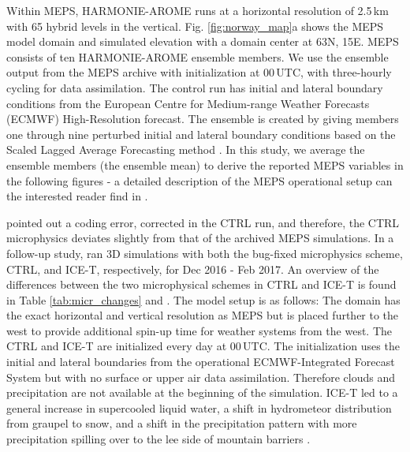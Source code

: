 \documentclass{ametsocV5}
\begin{document}
		Within MEPS, HARMONIE-AROME runs at a horizontal resolution of 2.5\,km with 65 hybrid levels in the vertical. Fig. \ref{fig:norway_map}a shows the MEPS model domain and simulated elevation with a domain center at 63\textdegree N, 15\textdegree E. MEPS consists of ten HARMONIE-AROME ensemble members. We use the ensemble output from the MEPS archive with initialization at 00\,UTC, with three-hourly cycling for data assimilation. The control run has initial and lateral boundary conditions from the European Centre for Medium-range Weather Forecasts (ECMWF) High-Resolution forecast. The ensemble is created by giving members one through nine perturbed initial and lateral boundary conditions based on the Scaled Lagged Average Forecasting method \citep{koltzow_metcoop_2017}. In this study, we average the ensemble members (the ensemble mean) to derive the reported MEPS variables in the following figures - a detailed description of the MEPS operational setup can the interested reader find in \citet{frogner_convection-permitting_2019}. 

	 	\citet{engdahl_effects_2020} pointed out a coding error, corrected in the CTRL run, and therefore, the CTRL microphysics deviates slightly from that of the archived MEPS simulations. In a follow-up study, \citet{engdahl_effects_2020} ran 3D simulations with both the bug-fixed microphysics scheme, CTRL, and ICE-T, respectively, for Dec 2016 - Feb 2017. An overview of the differences between the two microphysical schemes in CTRL and ICE-T is found in Table \ref{tab:micr_changes} and \citet{engdahl_improving_2020}. The \citet{engdahl_effects_2020} model setup is as follows: The domain has the exact horizontal and vertical resolution as MEPS but is placed further to the west to provide additional spin-up time for weather systems from the west. The CTRL and ICE-T are initialized every day at 00\,UTC. The initialization uses the initial and lateral boundaries from the operational ECMWF-Integrated Forecast System but with no surface or upper air data assimilation. Therefore clouds and precipitation are not available at the beginning of the simulation. ICE-T led to a general increase in supercooled liquid water, a shift in hydrometeor distribution from graupel to snow, and a shift in the precipitation pattern with more precipitation spilling over to the lee side of mountain barriers \citep{engdahl_effects_2020}.
		
		
		
\end{document}
